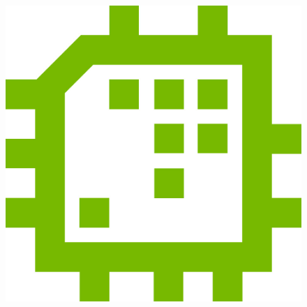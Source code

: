 \begin{titlepage}
\begin{minipage}[c]{0.8\textwidth}
\end{minipage}
\begin{minipage}[c]{0.2\textwidth}
	
	\begin{flushright}
	\begin{figure}[H]
		\includegraphics[scale=0.3]{images/FB1_SE.jpg}
		\label{logo_se}
	\end{figure}
	\end{flushright}

\end{minipage}

\end{titlepage}
 

